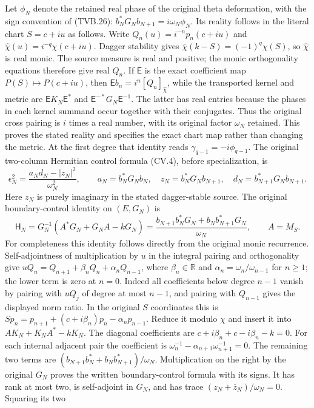 \documentclass[11pt]{article}
\newcommand{\R}{\mathbb R}
\begin{document}
Let $\phi_N$ denote the retained real phase of the original
theta deformation, with the sign convention of (TVB.26):
$b_N^*G_Nb_{N+1}=i\omega_N\phi_N$.
Its reality follows in the literal chart $S=c+iu$ as follows.
Write $Q_n(u)=i^{-n}p_n(c+iu)$ and
$\widehat\chi(u)=i^{-q}\chi(c+iu)$. Dagger stability gives
$\overline\chi(k-S)=(-1)^q\chi(S)$, so $\widehat\chi$
is real monic. The source measure is real and positive; the
monic orthogonality equations therefore give real $Q_n$.
If $\mathsf E$ is the exact coefficient map
$P(S)\mapsto P(c+iu)$, then
$\mathsf E b_n=i^n[Q_n]_{\widehat\chi}$, while the transported
kernel and metric are $\mathsf E K_N\mathsf E^*$ and
$\mathsf E^{-*}G_N\mathsf E^{-1}$.
The latter has real entries because the phases in each kernel
summand occur together with their conjugates. Thus the original
cross pairing is $i$ times a real number, with its original
factor $\omega_N$ retained. This proves the stated reality
and specifies the exact chart map rather than changing the metric.
At the first degree that identity reads
$\gamma_{q-1}=-i\phi_{q-1}$. The original two-column Hermitian
control formula (CV.4), before specialization, is
\[
 \epsilon_N^2=
 \frac{a_N d_N-|z_N|^2}{\omega_N^2},\qquad
 a_N=b_N^*G_Nb_N,\quad z_N=b_N^*G_Nb_{N+1},\quad
 d_N=b_{N+1}^*G_Nb_{N+1}.
 \tag{CJ.5}
\]
Here $z_N$ is purely imaginary in the stated dagger-stable
source. The original boundary-control identity on $(E,G_N)$ is
\[
 \mathsf H_N=G_N^{-1}(A^*G_N+G_NA-kG_N)
 =\frac{b_{N+1}b_N^*G_N+b_Nb_{N+1}^*G_N}{\omega_N},
 \qquad A=M_S.
\]
For completeness this identity follows directly from the original
monic recurrence. Self-adjointness of multiplication by $u$ in
the integral pairing and orthogonality give
$uQ_n=Q_{n+1}+\beta_nQ_n+\alpha_nQ_{n-1}$, where
$\beta_n\in\R$ and $\alpha_n=\omega_n/\omega_{n-1}$ for
$n\ge1$; the lower term is zero at $n=0$.
Indeed all coefficients below degree $n-1$ vanish by pairing
with $uQ_j$ of degree at most $n-1$, and pairing with
$Q_{n-1}$ gives the displayed norm ratio. In the original
$S$ coordinates this is
$Sp_n=p_{n+1}+(c+i\beta_n)p_n-\alpha_np_{n-1}$.
Reduce it modulo $\chi$ and insert it into
$AK_N+K_NA^*-kK_N$. The diagonal coefficients are
$c+i\beta_n+c-i\beta_n-k=0$. For each internal adjacent
pair the coefficient is
$\omega_n^{-1}-\alpha_{n+1}\omega_{n+1}^{-1}=0$.
The remaining two terms are
$(b_{N+1}b_N^*+b_Nb_{N+1}^*)/\omega_N$.
Multiplication on the right by the original $G_N$ proves
the written boundary-control formula with its signs.
It has rank at most two, is self-adjoint in $G_N$, and has
trace $(z_N+\overline z_N)/\omega_N=0$. Squaring its two
\end{document}
